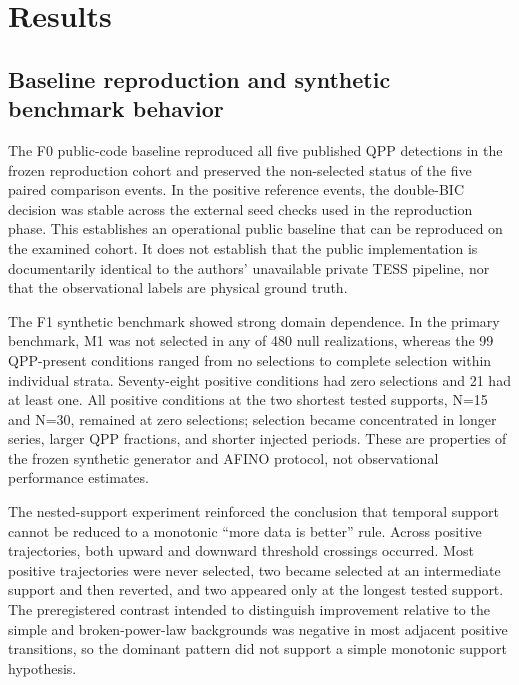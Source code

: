 \documentclass[11pt,a4paper]{article}
\begin{document}
\section{Results}
\subsection{Baseline reproduction and synthetic benchmark behavior}
The F0 public-code baseline reproduced all five published QPP detections in the frozen reproduction cohort and preserved the non-selected status of the five paired comparison events. In the positive reference events, the double-BIC decision was stable across the external seed checks used in the reproduction phase. This establishes an operational public baseline that can be reproduced on the examined cohort. It does not establish that the public implementation is documentarily identical to the authors' unavailable private TESS pipeline, nor that the observational labels are physical ground truth.

The F1 synthetic benchmark showed strong domain dependence. In the primary benchmark, M1 was not selected in any of 480 null realizations, whereas the 99 QPP-present conditions ranged from no selections to complete selection within individual strata. Seventy-eight positive conditions had zero selections and 21 had at least one. All positive conditions at the two shortest tested supports, N=15 and N=30, remained at zero selections; selection became concentrated in longer series, larger QPP fractions, and shorter injected periods. These are properties of the frozen synthetic generator and AFINO protocol, not observational performance estimates.

The nested-support experiment reinforced the conclusion that temporal support cannot be reduced to a monotonic ``more data is better'' rule. Across positive trajectories, both upward and downward threshold crossings occurred. Most positive trajectories were never selected, two became selected at an intermediate support and then reverted, and two appeared only at the longest tested support. The preregistered contrast intended to distinguish improvement relative to the simple and broken-power-law backgrounds was negative in most adjacent positive transitions, so the dominant pattern did not support a simple monotonic support hypothesis.
\end{document}
